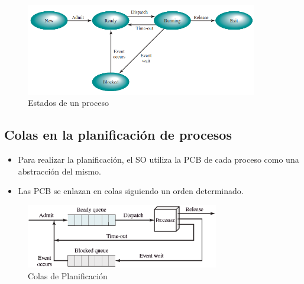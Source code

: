 \begin{figure}[h]
    \begin{center}
        \includegraphics[width=0.90\textwidth]{assets/estados.png}
    \end{center}
    \caption{Estados de un proceso}\label{fig:}
\end{figure}


\pagebreak
\subsection{Colas en la planificación de procesos}
\begin{itemize}
    \item Para realizar la planificación, el SO utiliza la PCB de cada proceso como una abstracción del mismo.
    \item Las PCB se enlazan en colas siguiendo un orden determinado.
\end{itemize}
\begin{figure}[h]
    \begin{center}
        \includegraphics[width=0.75\textwidth]{assets/ProcessQueue.eps}
    \end{center}
    \caption{Colas de Planificación}\label{fig:}
\end{figure}

